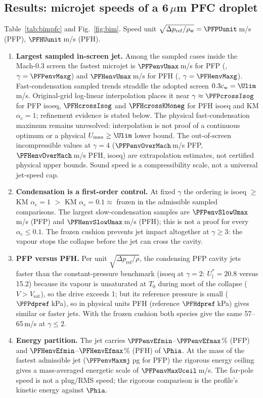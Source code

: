 \subsection{\texorpdfstring{Results: microjet speeds of a 6\,$\mu$m PFC droplet}{Results: microjet speeds of a 6 micrometre PFC droplet}}
Table~\ref{tab:bimpfc} and Fig.~\ref{fig:bim}. Speed unit $\sqrt{\Delta p_{\mathrm{ref}}/\rho_{\mathrm w}}=\PFPUunit$\,m/s
(PFP), $\PFHUunit$\,m/s (PFH).
\begin{enumerate}[leftmargin=*]
\item \textbf{Largest sampled in-screen jet.} Among the sampled cases inside the Mach-0.3 screen the fastest microjet is
$\PFPenvUmax$\,m/s for PFP (\PFPenvMaxClos, $\gamma=\PFPenvMaxg$) and $\PFHenvUmax$\,m/s for PFH (\PFHenvMaxClos,
$\gamma=\PFHenvMaxg$). Fast-condensation sampled trends straddle the adopted
screen $0.3c_{\mathrm w}=\Ulim$\,m/s. Original-grid log-linear interpolation places it near
$\gamma\approx\PFPcrossIsog$ for PFP isoeq, $\PFHcrossIsog$ and $\PFHcrossKMoneg$ for PFH
isoeq and KM $\alpha_{\mathrm c}=1$; refinement evidence is stated below.
The physical fast-condensation maximum remains unresolved: interpolation is not proof of a
continuous optimum or a physical $U_{\max}\ge\Ulim$ lower bound.
The out-of-screen incompressible values at $\gamma=4$ ($\PFPenvOverMach$\,m/s PFP,
$\PFHenvOverMach$\,m/s PFH, isoeq) are extrapolation estimates, not certified physical upper
bounds. Sound speed is a compressibility scale, not a universal jet-speed cap.
\item \textbf{Condensation is a first-order control.} At fixed $\gamma$ the ordering is
isoeq $\ge$ KM $\alpha_{\mathrm c}=1$ $>$ KM $\alpha_{\mathrm c}=0.1\approx$ frozen in the admissible sampled comparisons.
The largest slow-condensation samples are $\PFPenvSlowUmax$\,m/s (PFP) and
$\PFHenvSlowUmax$\,m/s (PFH); this is not a proof for every $\alpha_{\mathrm c}\le0.1$.
The frozen cushion prevents jet impact
altogether at $\gamma\ge3$: the vapour stops the collapse before the jet can cross the cavity.
\item \textbf{PFP versus PFH.} Per unit $\sqrt{\Delta p_{\mathrm{ref}}/\rho}$, the condensing PFP cavity jets faster than
the constant-pressure benchmark (isoeq at $\gamma=2$: $U^*_{\mathrm j}=20.8$ versus 15.2) because its vapour is
unsaturated at $T_0$ during most of the collapse ($V>V_{\mathrm{sat}}$), so the drive exceeds 1; but its reference
pressure is small ($\PFPdpref$\,kPa), so in physical units PFH (reference $\PFHdpref$\,kPa) gives similar or faster
jets. With the frozen cushion both species give the same 57--65\,m/s at $\gamma\le2$.
\item \textbf{Energy partition.} The jet carries $\PFPenvEfmin$--$\PFPenvEfmax$\% (PFP) and $\PFHenvEfmin$--$\PFHenvEfmax$\%
(PFH) of $\Phia$. At the mass of the fastest admissible jet ($\PFPenvMaxmj$\,pg for PFP) the rigorous energy ceiling
gives a mass-averaged energetic scale of $\PFPenvMaxUceil$\,m/s. The far-pole speed is not a
plug/RMS speed; the rigorous comparison is the profile's kinetic energy against $\Phia$.
\end{enumerate}
